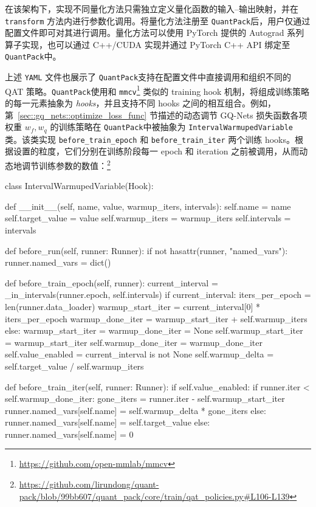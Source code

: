 \documentclass[
  fontset = source,
]{shtthesis}
\providecommand{\QP}{\texttt{QuantPack}}
\begin{document}
在该架构下，实现不同量化方法只需独立定义量化函数的输入--输出映射，并在 \verb|transform| 方法内进行参数化调用。将量化方法注册至 \QP 后，用户仅通过配置文件即可对其进行调用。量化方法可以使用 PyTorch 提供的 Autograd 系列算子实现，也可以通过 C++/CUDA 实现并通过 PyTorch C++ API 绑定至 \QP 中。

上述 \verb|YAML| 文件也展示了 \QP 支持在配置文件中直接调用和组织不同的 QAT 策略。\QP 使用和 \verb|mmcv|\footnote{\url{https://github.com/open-mmlab/mmcv}} 类似的 training hook 机制，将组成训练策略的每一元素抽象为 \emph{hooks}，并且支持不同 hooks 之间的相互组合。例如，第~\ref{sec::gq_nets::optimize_loss_func} 节描述的动态调节 GQ-Nets 损失函数各项权重 $w_f, w_q$ 的训练策略在 \QP 中被抽象为 \verb|IntervalWarmupedVariable| 类。该类实现 \verb|before_train_epoch| 和 \verb|before_train_iter| 两个训练 hooks。根据设置的粒度，它们分别在训练阶段每一 epoch 和 iteration 之前被调用，从而动态地调节训练参数的数值：\footnote{\url{https://github.com/lirundong/quant-pack/blob/99bb607/quant_pack/core/train/qat_policies.py\#L106-L139}}
\begin{python}
class IntervalWarmupedVariable(Hook):

    def __init__(self, name, value, warmup_iters, intervals):
        self.name = name
        self.target_value = value
        self.warmup_iters = warmup_iters
        self.intervals = intervals

    def before_run(self, runner: Runner):
        if not hasattr(runner, "named_vars"):
            runner.named_vars = dict()

    def before_train_epoch(self, runner):
        current_interval = _in_intervals(runner.epoch, self.intervals)
        if current_interval:
            iters_per_epoch = len(runner.data_loader)
            warmup_start_iter = current_interval[0] * iters_per_epoch
            warmup_done_iter = warmup_start_iter + self.warmup_iters
        else:
            warmup_start_iter = warmup_done_iter = None
        self.warmup_start_iter = warmup_start_iter
        self.warmup_done_iter = warmup_done_iter
        self.value_enabled = current_interval is not None
        self.warmup_delta = self.target_value / self.warmup_iters

    def before_train_iter(self, runner: Runner):
        if self.value_enabled:
            if runner.iter < self.warmup_done_iter:
                gone_iters = runner.iter - self.warmup_start_iter
                runner.named_vars[self.name] = self.warmup_delta * gone_iters
            else:
                runner.named_vars[self.name] = self.target_value
        else:
            runner.named_vars[self.name] = 0
\end{python}
\end{document}
